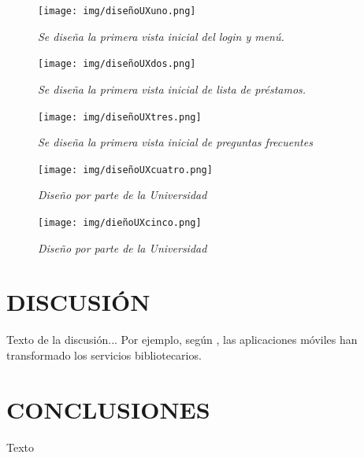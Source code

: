\documentclass[spanish]{ieee_upb}
\begin{document}
 \begin{figure}[H] 
	\centering
	\texttt{[image: img/diseñoUXuno.png]}
	\vspace{-1mm}
	\caption[Diseño inicial de UX Inicio de Sesión y Menú]{\textit{Se diseña la primera vista inicial del login y menú.}}
	\label{fig:UX1} 
\end{figure}

 \begin{figure}[H] 
	\centering
	\texttt{[image: img/diseñoUXdos.png]}
	\vspace{-1mm}
	\caption[Diseño inicial de UX Lista de Préstamos]{\textit{Se diseña la primera vista inicial de lista de préstamos.}}
	\label{fig:UX2} 
\end{figure}

 \begin{figure}[H] 
	\centering
	\texttt{[image: img/diseñoUXtres.png]}
	\vspace{-1mm}
	\caption[Diseño inicial de UX Preguntas Frecuentes]{\textit{Se diseña la primera vista inicial de preguntas frecuentes}}
	\label{fig:UX3} 
\end{figure}

 \begin{figure}[H] 
	\centering
	\texttt{[image: img/diseñoUXcuatro.png]}
	\vspace{-1mm}
	\caption[Diseño inicial de UX diseñador Login, Menú y Preguntas frecuentes]{\textit{Diseño por parte de la Universidad}}
	\label{fig:UX4} 
\end{figure}

\begin{figure}[H] 
	\centering
	\texttt{[image: img/dieñoUXcinco.png]}
	\vspace{-1mm}
	\caption[Diseño inicial de UX diseñador Lista de Préstamos]{\textit{Diseño por parte de la Universidad}}
	\label{fig:UX5} 
\end{figure}
\newpage
\section{DISCUSIÓN}
Texto de la discusión... Por ejemplo, según \cite{singh2023mobile}, las aplicaciones móviles han transformado los servicios bibliotecarios.

\newpage
\section{CONCLUSIONES}
Texto

\newpage
\end{document}
